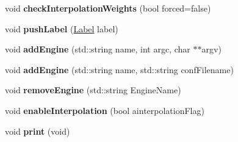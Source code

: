 \begin{DoxyCompactItemize}
\item 
\hypertarget{class_m_a_g_e_1_1_mage_ad690491113171be438989d5b070f384b}{void {\bfseries check\-Interpolation\-Weights} (bool forced=false)}\label{class_m_a_g_e_1_1_mage_ad690491113171be438989d5b070f384b}

\item 
\hypertarget{class_m_a_g_e_1_1_mage_a09eeea43ffba1519cb5709f39ddda43b}{void {\bfseries push\-Label} (\hyperlink{class_m_a_g_e_1_1_label}{Label} label)}\label{class_m_a_g_e_1_1_mage_a09eeea43ffba1519cb5709f39ddda43b}

\item 
\hypertarget{class_m_a_g_e_1_1_mage_a44e46eaece0747f143196739223e0435}{void {\bfseries add\-Engine} (std\-::string name, int argc, char $\ast$$\ast$argv)}\label{class_m_a_g_e_1_1_mage_a44e46eaece0747f143196739223e0435}

\item 
\hypertarget{class_m_a_g_e_1_1_mage_a843579b3a69417dc17378feb7b965848}{void {\bfseries add\-Engine} (std\-::string name, std\-::string conf\-Filename)}\label{class_m_a_g_e_1_1_mage_a843579b3a69417dc17378feb7b965848}

\item 
\hypertarget{class_m_a_g_e_1_1_mage_aa374565aaed67cb05b39516e11eb6638}{void {\bfseries remove\-Engine} (std\-::string Engine\-Name)}\label{class_m_a_g_e_1_1_mage_aa374565aaed67cb05b39516e11eb6638}

\item 
\hypertarget{class_m_a_g_e_1_1_mage_a082da9f9d38a4d65029d0d700b52405c}{void {\bfseries enable\-Interpolation} (bool ainterpolation\-Flag)}\label{class_m_a_g_e_1_1_mage_a082da9f9d38a4d65029d0d700b52405c}

\item 
\hypertarget{class_m_a_g_e_1_1_mage_a925cd537c72cd98e1ed488398ad46e45}{void {\bfseries print} (void)}\label{class_m_a_g_e_1_1_mage_a925cd537c72cd98e1ed488398ad46e45}

\end{DoxyCompactItemize}
